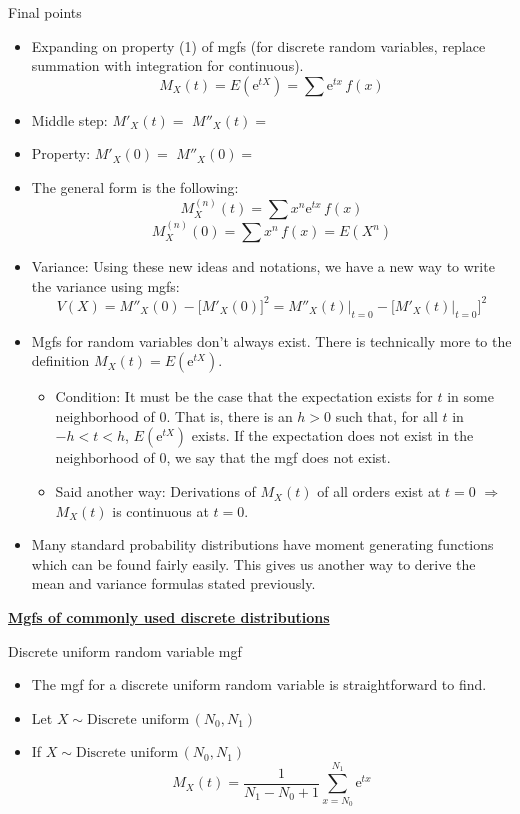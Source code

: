 \documentclass{article}
\newcommand{\bu}[1]{\textbf{\ul{#1}}}				%
\newcommand{\follow}[1]{\sim \text{#1}\,}		%
\newcommand{\e}{\mathrm{e}}		%
\begin{document}
Final points\bigskip
\begin{itemize}
    \item Expanding on property (1) of mgfs (for discrete random variables, replace summation with integration for continuous).
     \[M_X(t) = E(\e^{tX}) = \sum \e^{tx} \, f(x)\]
     \item[] Middle step: $M'_X(t) = $ \hspace{150pt}$ M''_X(t) = $\bigskip
     \item[] Property: $M'_X(0) = $\hspace{150pt} $M''_X(0) = $\bigskip
     \item The general form is the following:
     \[M_X^{(n)}(t) = \sum x^n \e^{tx} \, f(x)\]
     \[M_X^{(n)}(0) = \sum x^n \, f(x) = E(X^n)\]\bigskip
     \item Variance: Using these new ideas and notations, we have a new way to write the variance using mgfs:
     \[V(X) = M''_X(0) - \big[M'_X(0)\big]^2 = M''_X(t)\big\rvert_{t = 0} - \big[M'_X(t)\big\rvert_{t = 0}\big]^2\]
    \item Mgfs for random variables don't always exist. There is technically more to the definition $M_X(t) = E(\e^{tX})$.
    \begin{itemize}
        \item Condition: It must be the case that the expectation exists for $t$ in some neighborhood of 0. That is, there is an $h > 0$ such that, for all $t$ in $-h < t < h$, $E(\e^{tX})$ exists. If the expectation does not exist in the neighborhood of 0, we say that the mgf does not exist.
        \item Said another way: Derivations of $M_X(t)$ of all orders exist at $t = 0$ $\Longrightarrow$ $M_X(t)$ is continuous at $t = 0$.
    \end{itemize}
    \item Many standard probability distributions have moment generating functions which can be found fairly easily. This gives us another way to derive the mean and variance formulas stated previously.
\end{itemize}\bigskip

\newpage

\bu{Mgfs of commonly used discrete distributions}\bigskip

Discrete uniform random variable mgf\bigskip
\begin{itemize}
    \item The mgf for a discrete uniform random variable is straightforward to find.
    \item Let $X \follow{Discrete uniform}(N_0, N_1)$\vspace{100pt}
    \item If $X \follow{Discrete uniform}(N_0, N_1)$
    \[M_X(t) = \frac{1}{N_1 - N_0 + 1} \sum_{x = N_0}^{N_1} \e^{tx}\]
\end{itemize}\vspace{50pt}
\end{document}
